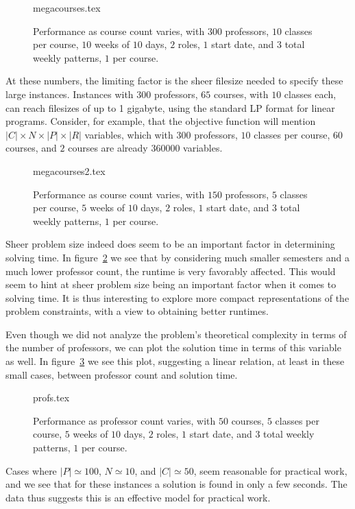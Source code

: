 \begin{figure}
  \begin{center}
    {megacourses.tex}
    \caption{Performance as course count varies, with $300$ professors, $10$ classes per course, $10$ weeks of $10$ days, $2$ roles, $1$ start date, and $3$ total weekly patterns, $1$ per course.}
    \label{bench:megacourses}
  \end{center}
\end{figure}

At these numbers, the limiting factor is the sheer filesize needed to specify these large instances. Instances with $300$ professors, $65$ courses, with $10$ classes each, can reach filesizes of up to 1 gigabyte, using the standard LP format for linear programs. Consider, for example, that the objective function will mention $|C| \times N \times |P| \times |R|$ variables, which with $300$ professors, $10$ classes per course, $60$ courses, and $2$ courses are already $360000$ variables.

\begin{figure}
  \begin{center}
    {megacourses2.tex}
    \caption{Performance as course count varies, with $150$ professors, $5$ classes per course, $5$ weeks of $10$ days, $2$ roles, $1$ start date, and $3$ total weekly patterns, $1$ per course.}
    \label{bench:megacourses2}
  \end{center}
\end{figure}

Sheer problem size indeed does seem to be an important factor in determining solving time. In figure~\ref{bench:megacourses2} we see that by considering much smaller semesters and a much lower professor count, the runtime is very favorably affected. This would seem to hint at sheer problem size being an important factor when it comes to solving time. It is thus interesting to explore more compact representations of the problem constraints, with a view to obtaining better runtimes.

Even though we did not analyze the problem's theoretical complexity in terms of the number of professors, we can plot the solution time in terms of this variable as well. In figure~\ref{bench:profs} we see this plot, suggesting a linear relation, at least in these small cases, between professor count and solution time.

\begin{figure}
  \begin{center}
    {profs.tex}
    \caption{Performance as professor count varies, with $50$ courses, $5$ classes per course, $5$ weeks of $10$ days, $2$ roles, $1$ start date, and $3$ total weekly patterns, $1$ per course.}
    \label{bench:profs}
  \end{center}
\end{figure}

Cases where $|P| \simeq 100$, $N \simeq 10$, and $|C| \simeq 50$, seem reasonable for practical work, and we see that for these instances a solution is found in only a few seconds. The data thus suggests this is an effective model for practical work.


